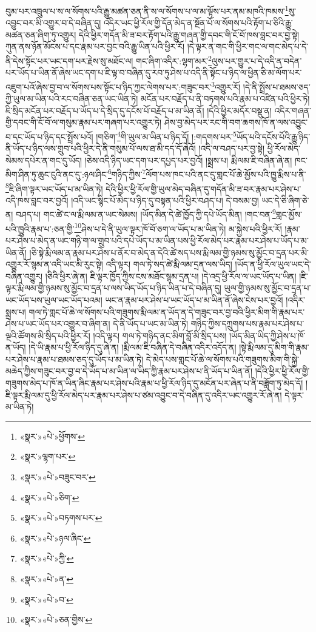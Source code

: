 བུམ་པར་འཁྲུལ་པ་ས་ལ་སོགས་པའི་རྒྱུ་མཚན་ཅན་ནི་ས་ལ་སོགས་པ་ལ་མ་ལྟོས་པར་ནམ་མཁའི་ཁམས་\footnote{«སྣར་»«པེ་»ཕྱོགས་}སུ་འབྱུང་བར་མི་འགྱུར་བ་དེ་བཞིན་དུ། འདིར་ཡང་ཕྱི་རོལ་གྱི་དོན་མེད་ན་སྔོན་པོ་ལ་སོགས་པའི་རྟོག་པ་ཅིའི་རྒྱུ་མཚན་ཅན་ཞིག་ཏུ་འགྱུར། དེའི་ཕྱིར་གདོན་མི་ཟ་བར་རྟོག་པའི་རྒྱུ་གཞན་གྱི་དབང་གི་ངོ་བོ་ཁས་བླང་བར་བྱ་སྟེ། ཀུན་ནས་ཉོན་མོངས་པ་དང་རྣམ་པར་བྱང་བའི་རྒྱུ་ཡིན་པའི་ཕྱིར་རོ། །དེ་ལྟར་ན་གང་གི་ཕྱིར་གང་ལ་གང་མེད་པ་དེ་ནི་དེས་སྟོང་པར་ཡང་དག་པར་རྗེས་སུ་མཐོང་ལ། གང་ཞིག་འདིར་:ལྷག་མར་\footnote{«སྣར་»ལྷག་པར་}ལུས་པར་གྱུར་པ་དེ་འདི་ན་བདེན་པར་ཡོད་པ་ཡིན་ནོ་ཞེས་ཡང་དག་པ་ཇི་ལྟ་བ་བཞིན་དུ་རབ་ཏུ་ཤེས་པ་འདི་ནི་སྟོང་པ་ཉིད་ལ་ཕྱིན་ཅི་མ་ལོག་པར་འཇུག་པའོ་ཞེས་བྱ་བ་ལ་སོགས་པས་སྟོང་པ་ཉིད་ཀྱང་ལེགས་པར་:གཟུང་བར་\footnote{«སྣར་»«པེ་»བཟུང་བར་}འགྱུར་རོ། །དེ་ནི་སྤྲོས་པ་ཐམས་ཅད་ཀྱི་ཡུལ་མ་ཡིན་པའི་རང་བཞིན་ཅན་ཡང་ཡིན་ཏེ། མངོན་པར་བརྗོད་པ་ནི་བཏགས་པའི་རྣམ་པ་འཛིན་པའི་ཕྱིར་ཏེ། ཇི་སྲིད་མངོན་པར་བརྗོད་པ་ཡོད་པ་དེ་སྲིད་དུ་དངོས་པོ་བརྗོད་པ་མ་ཡིན་ནོ། །དེའི་ཕྱིར་མདོར་བསྡུ་ན། འདིར་གཞན་གྱི་དབང་གི་ངོ་བོ་ལ་གསུམ་རྣམ་པར་གཞག་པར་འགྱུར་ཏེ། ཤེས་བྱ་མེད་པར་རང་གི་བག་ཆགས་ཁོ་ན་ལས་འབྱུང་བ་དང་ཡོད་པ་ཉིད་དང་སྤྲོས་པའོ། །གཅིག་\footnote{«སྣར་»«པེ་»ཅིག་}གི་ཡུལ་མ་ཡིན་པ་ཉིད་དོ། །:གདགས་པར་\footnote{«སྣར་»«པེ་»བཏགས་པར་}ཡོད་པའི་དངོས་པོའི་རྒྱུ་ཉིད་ནི་ཡོད་པ་ཉིད་ལས་གྲུབ་པའི་ཕྱིར་དེ་ནི་གསུམ་པོ་ལས་ཐ་མི་དད་དོ་ཞེའོ། །འདི་ལ་བཤད་པར་བྱ་སྟེ། ཕྱི་རོལ་མེད་སེམས་དཔེར་ན་གང་དུ་ཡོད། །ཅེས་འདི་ཉིད་ཡང་དག་པར་དཔྱད་པར་བྱའོ། །སྨྲས་པ། རྨི་ལམ་ཇི་བཞིན་ཞེ་ན། ཁང་མིག་ཤིན་ཏུ་ཆུང་ངུའི་ནང་དུ་:ཉལ་ཤིང་\footnote{«སྣར་»«པེ་»ཉལ་ཞིང་}གཉིད་ཀྱིས་\footnote{«སྣར་»«པེ་»ཀྱི་}ལོག་པས་ཁང་པའི་ནང་དུ་གླང་པོ་ཆེ་མྱོས་པའི་ཁྱུ་རྨིས་པ་ནི་\footnote{«སྣར་»«པེ་»ན་}ཇི་ཞིག་ལྟར་ཡང་ཡོད་པ་མ་ཡིན་ཏེ། དེའི་ཕྱིར་ཕྱི་རོལ་གྱི་ཡུལ་མེད་བཞིན་དུ་གདོན་མི་ཟ་བར་རྣམ་པར་ཤེས་པ་འདི་ཁས་བླང་བར་བྱའོ། །འདི་ཡང་སྙིང་པོ་མེད་པ་ཉིད་དུ་བསྟན་པའི་ཕྱིར་བཤད་པ། དེ་བསམ་བྱ། ཡང་དེ་ཅི་ཞིག་ཅེ་ན། བཤད་པ། གང་ཚེ་ང་ལ་རྨི་ལམ་ན་ཡང་སེམས། །ཡོད་མིན་དེ་ཚེ་ཁྱོད་ཀྱི་དཔེ་ཡོད་མིན། །གང་བན་\footnote{«སྣར་»«པེ་»བ་}གླང་མྱོས་པའི་ཁྱུའི་རྣམ་པ་:ཅན་གྱི་\footnote{«སྣར་»«པེ་»ཅན་གྱིས་}ཤེས་པ་དེ་ནི་ཡུལ་ལྟར་ཁོ་བོ་ཅག་ལ་ཡོད་པ་མ་ཡིན་ཏེ། མ་སྐྱེས་པའི་ཕྱིར་རོ། །རྣམ་པར་ཤེས་པ་མེད་ན་ཡང་གཉི་ག་ལ་གྲུབ་པའི་དཔེ་ཡོད་པ་མ་ཡིན་པས་ཕྱི་རོལ་མེད་པར་རྣམ་པར་ཤེས་པ་ཡོད་པ་མ་ཡིན་ནོ། །ཅི་སྟེ་རྨི་ལམ་ན་རྣམ་པར་ཤེས་པ་ནོར་བ་མེད་ན་དེའི་ཚེ་སད་པས་རྨི་ལམ་གྱི་ཉམས་སུ་མྱོང་བ་དྲན་པར་མི་འགྱུར་རོ་སྙམ་ན་འདི་ཡང་མི་རུང་སྟེ། འདི་ལྟར། གལ་ཏེ་སད་ཚེ་རྨི་ལམ་དྲན་ལས་ཡིད། །ཡོད་ན་ཕྱི་རོལ་ཡུལ་ཡང་དེ་བཞིན་འགྱུར། །ཅིའི་ཕྱིར་ཞེ་ན། ཇི་ལྟར་ཁྱོད་ཀྱིས་ངས་མཐོང་སྙམ་དྲན་པ། །དེ་འདྲ་ཕྱི་རོལ་ལ་ཡང་ཡོད་པ་ཡིན། །ཇི་ལྟར་རྨི་ལམ་གྱི་ཉམས་སུ་མྱོང་བ་དྲན་པ་ལས་ཡིད་ཡོད་པ་ཉིད་ཡིན་པ་དེ་བཞིན་དུ། ཡུལ་གྱི་ཉམས་སུ་མྱོང་བ་དྲན་པ་ཡང་ཡོད་པས་ཡུལ་ཡང་ཡོད་པའམ། ཡང་ན་རྣམ་པར་ཤེས་པ་ཡང་ཡོད་པ་མ་ཡིན་ནོ་ཞེས་ངེས་པར་བྱའོ། །འདིར་སྨྲས་པ། གལ་ཏེ་གླང་པོ་ཆེ་ལ་སོགས་པའི་གཟུགས་རྨི་ལམ་ན་ཡོད་ན་དེ་གཟུང་བར་བྱ་བའི་ཕྱིར་མིག་གི་རྣམ་པར་ཤེས་པ་ཡང་ཡོད་པར་འགྱུར་བ་ཞིག་ན། དེ་ནི་ཡོད་པ་ཡང་མ་ཡིན་ཏེ། གཉིད་ཀྱིས་དཀྲུགས་པས་རྣམ་པར་ཤེས་པ་ལྔའི་ཚོགས་མི་སྲིད་པའི་ཕྱིར་རོ། །འདི་ལྟར། གལ་ཏེ་གཉིད་ནང་མིག་བློ་མི་སྲིད་པས། །ཡོད་མིན་ཡིད་ཀྱི་ཤེས་པ་ཁོ་ན་ཡོད། །དེ་ཡི་རྣམ་པ་ཕྱི་རོལ་ཉིད་དུ་ཞེ་ན། །རྨི་ལམ་ཇི་བཞིན་དེ་བཞིན་འདིར་འདོད་ན། །སྟེ་རྨི་ལམ་དུ་མིག་གི་རྣམ་པར་ཤེས་པ་རྣམ་པ་ཐམས་ཅད་དུ་ཡོད་པ་མ་ཡིན་ཏེ། དེ་མེད་པས་གླང་པོ་ཆེ་ལ་སོགས་པའི་གཟུགས་མིག་གི་སྐྱེ་མཆེད་ཀྱིས་གཟུང་བར་བྱ་བ་དེ་ཡོད་པ་མ་ཡིན་ལ་ཡིད་ཀྱི་རྣམ་པར་ཤེས་པ་ནི་ཡོད་པ་ཡིན་ནོ། །དེའི་ཕྱིར་ཕྱི་རོལ་གྱི་གཟུགས་མེད་པ་ཁོ་ན་ཡིན་ཞིང་རྣམ་པར་ཤེས་པའི་རྣམ་པ་ཕྱི་རོལ་ཉིད་དུ་མངོན་པར་ཞེན་པ་ནི་བཟློག་ཏུ་མེད་དོ། །ཇི་ལྟར་རྨི་ལམ་དུ་ཕྱི་རོལ་མེད་པར་རྣམ་པར་ཤེས་པ་ཙམ་འབྱུང་བ་དེ་བཞིན་དུ་འདིར་ཡང་འགྱུར་རོ་ཞེ་ན། དེ་ལྟར་མ་ཡིན་ཏེ། 